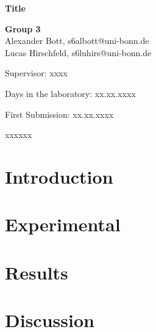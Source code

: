 \documentclass[fontsize=11pt,reqno,a4paper,oneside]{scrartcl}
\makeatletter
\def\Autor{\textbf{Group 3}\\Alexander Bott, s6albott@uni-bonn.de \\ Lucas Hirschfeld, s6luhirs@uni-bonn.de}
\def\Titel{Title}
\def\Date{First Submission: xx.xx.xxxx}
\def\PiC{Supervisor: xxxx}
\def\Lab{Days in the laboratory: xx.xx.xxxx}
\def\Abstract{xxxxxx}
\makeatother
\begin{document}
\pagestyle{empty}
\begin{titlepage}
    \singlespacing
    \begin{center}
        \vspace*{\fill}
        {\LARGE\bfseries \Titel}\par\vspace{2cm}
        {\Autor\par\vspace{0.5cm}\PiC\par\vspace{1cm}\Lab\par\vspace{0.2cm}\Date\par\vspace{5cm}}
    
    \end{center}
        {\Abstract\vspace{0.5cm}\par}\vfill
\end{titlepage}


\pagestyle{scrheadings}
\ihead{\headmark}
\ofoot{\pagemark}
\tableofcontents
{}
\clearpage

\newpage
\section{Introduction}


\newpage
\section{Experimental}


\newpage
\section{Results}



\newpage
\section{Discussion}

\newpage
\printbibliography[heading=bibintoc,
title={References}] 
\end{document}
